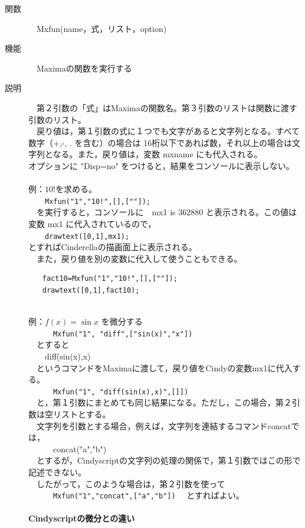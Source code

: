 \documentclass[papersize,a4paper,12pt,uplatex]{jsarticle}
\begin{document}
\begin{description}
\hypertarget{mxfun}{}
\item[関数]　Mxfun(name，式，リスト，option)
\item[機能]　Maximaの関数を実行する
\item[説明]　第２引数の「式」はMaximaの関数名。第３引数のリストは関数に渡す引数のリスト。\\
　戻り値は，第１引数の式に１つでも文字があると文字列となる。すべて数字（+,-, . を含む）の場合は
16桁以下であれば数，それ以上の場合は文字列となる。また，戻り値は，変数 mxname にも代入される。\\
オプションに "Disp=no" をつけると，結果をコンソールに表示しない。\\
　\\
例：$10!$を求める。\\
　　\verb|Mxfun("1","10!",[],[""]);|\\
　を実行すると，コンソールに　mx1 is 362880 と表示される。この値は変数 mx1 に代入されているので，\\
　　\verb|drawtext([0,1],mx1);|\\
とすればCinderellaの描画面上に表示される。\\
　また，戻り値を別の変数に代入して使うこともできる。
\begin{verbatim}
　　fact10=Mxfun("1","10!",[],[""]);
　　drawtext([0,1],fact10);
\end{verbatim}
　\\
例：$f(x)=\sin x$ を微分する\\
　　　\verb|Mxfun("1", "diff",["sin(x)","x"])|\\
　とすると\\
　　diff(sin(x),x)\\
　というコマンドをMaximaに渡して，戻り値をCindyの変数mx1に代入する。\\
　　　\verb|Mxfun("1", "diff(sin(x),x)",[]])|\\
　と，第１引数にまとめても同じ結果になる。ただし，この場合，第２引数は空リストとする。\\
　文字列を引数とする場合，例えば，文字列を連結するコマンドconcatでは，\\
　　　concat("a","b")\\
　とするが，Cindyscriptの文字列の処理の関係で，第１引数ではこの形で記述できない。\\
　したがって，このような場合は，第２引数を使って\\
　　　\verb|Mxfun("1","concat",["a","b"])|
　とすればよい。\\
　\\
{\bf Cindyscriptの微分との違い}\\

\end{description}
\end{document}

